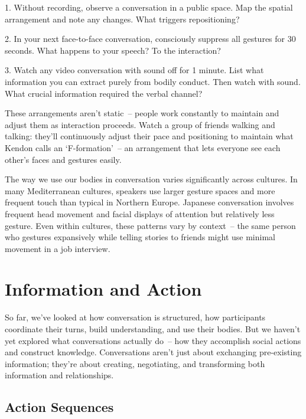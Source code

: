 \begin{tcolorbox}[title=Exercise: Bodies and Space, colback=white, colframe=orange!75!black, fonttitle=\bfseries]
1. Without recording, observe a conversation in a public space. Map the spatial arrangement and note any changes. What triggers repositioning?

2. In your next face-to-face conversation, consciously suppress all gestures for 30 seconds. What happens to your speech? To the interaction?

3. Watch any video conversation with sound off for 1 minute. List what information you can extract purely from bodily conduct. Then watch with sound. What crucial information required the verbal channel?
\end{tcolorbox}

These arrangements aren't static~-- people work constantly to maintain and adjust them as interaction proceeds. Watch a group of friends walking and talking: they'll continuously adjust their pace and positioning to maintain what Kendon calls an `F-formation'~-- an arrangement that lets everyone see each other's faces and gestures easily.

The way we use our bodies in conversation varies significantly across cultures. In many Mediterranean cultures, speakers use larger gesture spaces and more frequent touch than typical in Northern Europe. Japanese conversation involves frequent head movement and facial displays of attention but relatively less gesture. Even within cultures, these patterns vary by context~-- the same person who gestures expansively while telling stories to friends might use minimal movement in a job interview.

\section{Information and Action} \label{sec:info-action}

So far, we've looked at how conversation is structured, how participants coordinate their turns, build understanding, and use their bodies. But we haven't yet explored what conversations actually do~-- how they accomplish social actions and construct knowledge. Conversations aren't just about exchanging pre-existing information; they're about creating, negotiating, and transforming both information and relationships.

\subsection{Action Sequences} \label{subsec:action-seq}

